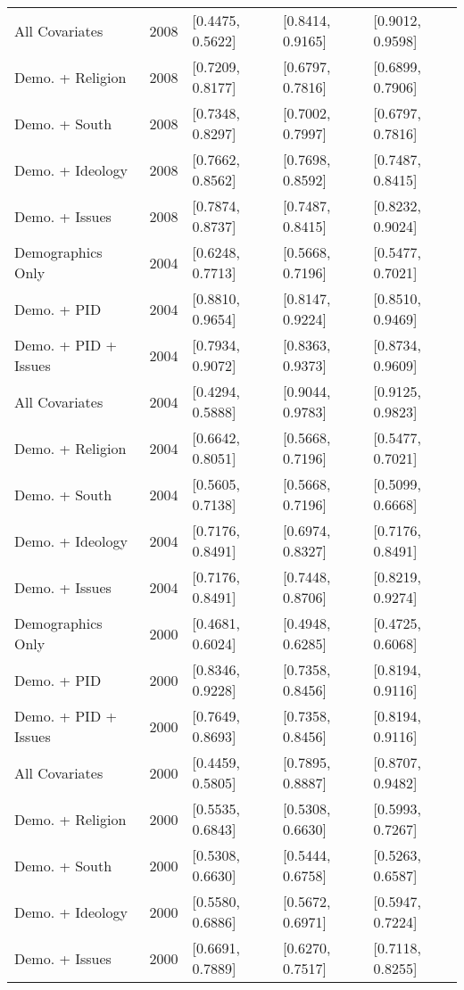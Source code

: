 \begin{longtable}{lrlll}
  All Covariates & 2008 & [0.4475, 0.5622] & [0.8414, 0.9165] & [0.9012, 0.9598] \\ 
  Demo. + Religion & 2008 & [0.7209, 0.8177] & [0.6797, 0.7816] & [0.6899, 0.7906] \\ 
  Demo. + South & 2008 & [0.7348, 0.8297] & [0.7002, 0.7997] & [0.6797, 0.7816] \\ 
  Demo. + Ideology & 2008 & [0.7662, 0.8562] & [0.7698, 0.8592] & [0.7487, 0.8415] \\ 
  Demo. + Issues & 2008 & [0.7874, 0.8737] & [0.7487, 0.8415] & [0.8232, 0.9024] \\ 
  Demographics Only & 2004 & [0.6248, 0.7713] & [0.5668, 0.7196] & [0.5477, 0.7021] \\ 
  Demo. + PID & 2004 & [0.8810, 0.9654] & [0.8147, 0.9224] & [0.8510, 0.9469] \\ 
  Demo. + PID + Issues & 2004 & [0.7934, 0.9072] & [0.8363, 0.9373] & [0.8734, 0.9609] \\ 
  All Covariates & 2004 & [0.4294, 0.5888] & [0.9044, 0.9783] & [0.9125, 0.9823] \\ 
  Demo. + Religion & 2004 & [0.6642, 0.8051] & [0.5668, 0.7196] & [0.5477, 0.7021] \\ 
  Demo. + South & 2004 & [0.5605, 0.7138] & [0.5668, 0.7196] & [0.5099, 0.6668] \\ 
  Demo. + Ideology & 2004 & [0.7176, 0.8491] & [0.6974, 0.8327] & [0.7176, 0.8491] \\ 
  Demo. + Issues & 2004 & [0.7176, 0.8491] & [0.7448, 0.8706] & [0.8219, 0.9274] \\ 
  Demographics Only & 2000 & [0.4681, 0.6024] & [0.4948, 0.6285] & [0.4725, 0.6068] \\ 
  Demo. + PID & 2000 & [0.8346, 0.9228] & [0.7358, 0.8456] & [0.8194, 0.9116] \\ 
  Demo. + PID + Issues & 2000 & [0.7649, 0.8693] & [0.7358, 0.8456] & [0.8194, 0.9116] \\ 
  All Covariates & 2000 & [0.4459, 0.5805] & [0.7895, 0.8887] & [0.8707, 0.9482] \\ 
  Demo. + Religion & 2000 & [0.5535, 0.6843] & [0.5308, 0.6630] & [0.5993, 0.7267] \\ 
  Demo. + South & 2000 & [0.5308, 0.6630] & [0.5444, 0.6758] & [0.5263, 0.6587] \\ 
  Demo. + Ideology & 2000 & [0.5580, 0.6886] & [0.5672, 0.6971] & [0.5947, 0.7224] \\ 
  Demo. + Issues & 2000 & [0.6691, 0.7889] & [0.6270, 0.7517] & [0.7118, 0.8255] \\ 

\end{longtable}
